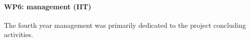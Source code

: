 \paragraph{WP6: management (IIT)}

The fourth year management was primarily dedicated to the project concluding activities. 
